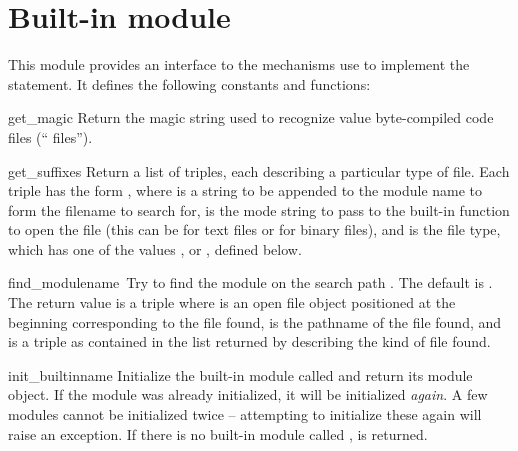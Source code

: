 \section{Built-in module }

This module provides an interface to the mechanisms use to implement
the  statement.  It defines the following constants and
functions:

\renewcommand{\indexsubitem}{(in module struct)}

\begin{funcdesc}{get_magic}{}
Return the magic string used to recognize value byte-compiled code
files (`` files'').
\end{funcdesc}

\begin{funcdesc}{get_suffixes}{}
Return a list of triples, each describing a particular type of file.
Each triple has the form , where  is a string to be appended to the
module name to form the filename to search for,  is the mode
string to pass to the built-in  function to open the file
(this can be  for text files or  for binary
files), and  is the file type, which has one of the values
,  or , defined
below.
\end{funcdesc}

\begin{funcdesc}{find_module}{name\, }
Try to find the module  on the search path .  The
default  is .  The return value is a triple
 where
 is an open file object positioned at the beginning
corresponding to the file found,  is the pathname of the
file found, and  is a triple as contained in the list
returned by  describing the kind of file found.
\end{funcdesc}

\begin{funcdesc}{init_builtin}{name}
Initialize the built-in module called  and return its module
object.  If the module was already initialized, it will be initialized
{\em again}.  A few modules cannot be initialized twice -- attempting
to initialize these again will raise an exception.  If there is no
built-in module called ,  is returned.
\end{funcdesc}

